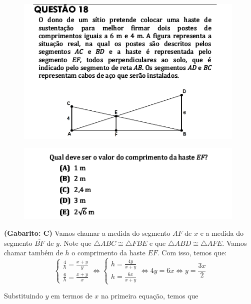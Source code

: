 \documentclass[a4paper]{article}
\begin{document}
\begin{figure}[H]
	\begin{center}
		\includegraphics[width=11cm]{L5Q18_1.png}
	\end{center}
\end{figure}
\begin{figure}[H]
	\begin{center}
		\includegraphics[width=11cm]{L5Q18_2.png}
	\end{center}
\end{figure}
\par\textbf{(Gabarito: C)} Vamos chamar a medida do segmento $\overline{AF}$ de $x$ e a medida do segmento $\overline{BF}$ de $y$. Note que $\triangle ABC \cong\triangle FBE$ e que $\triangle ABD\cong \triangle AFE$. Vamos chamar também de $h$ o comprimento da haste $EF$. Com isso, temos que:
\begin{equation*}
	\begin{cases}
		\displaystyle{ \frac{4}{h} = \frac{x+y}{y} } \\
		\displaystyle{ \frac{6}{h} = \frac{x+y}{x} }
	\end{cases} \iff \begin{cases}
	h = \displaystyle{\frac{4y}{x+y}} \\
	h = \displaystyle{\frac{6x}{x+y}}
	\end{cases} \iff 4y = 6x \iff y = \frac{3x}{2}
\end{equation*}
\par\vspace{0.3cm} Substituindo $y$ em termos de $x$ na primeira equação, temos que
\end{document}
